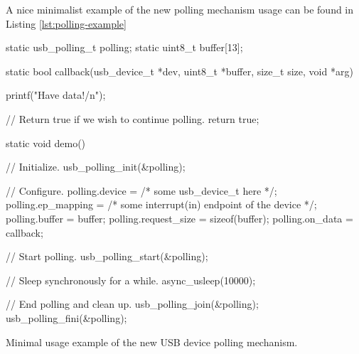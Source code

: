 A nice minimalist example of the new polling mechanism usage can be found in
Listing \ref{lst:polling-example}

\begin{listing}
	\begin{code}
		static usb_polling_t polling;
		static uint8_t buffer[13];

		static bool callback(usb_device_t *dev, uint8_t *buffer, size_t size, void *arg)
		{
			printf("Have data!/n");

			// Return true if we wish to continue polling.
			return true;
		}

		static void demo()
		{
			// Initialize.
			usb_polling_init(&polling);

			// Configure.
			polling.device = /* some usb_device_t here */;
			polling.ep_mapping = /* some interrupt(in) endpoint of the device */;
			polling.buffer = buffer;
			polling.request_size = sizeof(buffer);
			polling.on_data = callback;

			// Start polling.
			usb_polling_start(&polling);

			// Sleep synchronously for a while.
			async_usleep(10000);

			// End polling and clean up.
			usb_polling_join(&polling);
			usb_polling_fini(&polling);
		}
	\end{code}
	\caption{Minimal usage example of the new USB device polling mechanism.}
	\label{lst:polling-example}
\end{listing}


